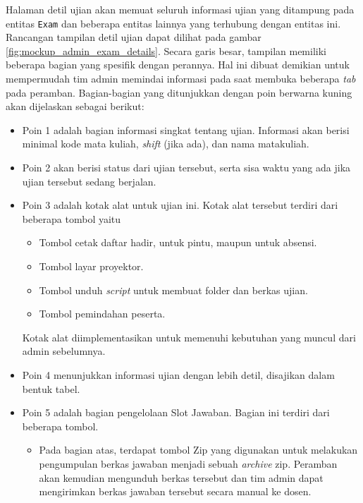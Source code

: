     Halaman detil ujian akan memuat seluruh informasi ujian yang ditampung pada
    entitas \texttt{Exam} dan beberapa entitas lainnya yang terhubung dengan
    entitas ini. Rancangan tampilan detil ujian dapat dilihat pada gambar
    \ref{fig:mockup_admin_exam_details}. Secara garis besar, tampilan memiliki
    beberapa bagian yang spesifik dengan perannya. Hal ini dibuat demikian untuk
    mempermudah tim admin memindai informasi pada saat membuka beberapa
    \textit{tab} pada peramban. Bagian-bagian yang ditunjukkan dengan poin
    berwarna kuning akan dijelaskan sebagai berikut:
    \begin{itemize}
        \item Poin 1 adalah bagian informasi singkat tentang ujian. Informasi
            akan berisi minimal kode mata kuliah, \textit{shift} (jika ada), dan
            nama matakuliah.
            
        \item Poin 2 akan berisi status dari ujian tersebut, serta sisa waktu
            yang ada jika ujian tersebut sedang berjalan.
            
        \item Poin 3 adalah kotak alat untuk ujian ini. Kotak alat tersebut
            terdiri dari beberapa tombol yaitu
            \begin{itemize}
                \item Tombol cetak daftar hadir, untuk pintu, maupun untuk
                absensi.
                \item Tombol layar proyektor.
                \item Tombol unduh \textit{script} untuk membuat folder dan
                berkas ujian.
                \item Tombol pemindahan peserta.
            \end{itemize}
            Kotak alat diimplementasikan untuk memenuhi kebutuhan yang muncul
            dari admin sebelumnya.
            
        \item Poin 4 menunjukkan informasi ujian dengan lebih detil, disajikan
        dalam bentuk tabel.
        
        \item Poin 5 adalah bagian pengelolaan Slot Jawaban. Bagian ini terdiri
        dari beberapa tombol.
            \begin{itemize}
                \item Pada bagian atas, terdapat tombol Zip yang digunakan untuk
                    melakukan pengumpulan berkas jawaban menjadi sebuah
                    \textit{archive} zip. Peramban akan kemudian mengunduh
                    berkas tersebut dan tim admin dapat mengirimkan berkas
                    jawaban tersebut secara manual ke dosen.
                    

\end{itemize}
\end{itemize}
